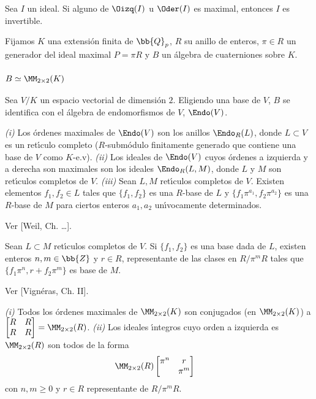 \begin{propoMaxOrdInvertible}
 Sea $I$ un ideal. Si alguno de $\Oizq(I)$ u $\Oder(I)$ es maximal,
 entonces $I$ es invertible.
\end{propoMaxOrdInvertible}

Fijamos $K$ una extensi\'{o}n finita de $\bb{Q}_{p}$, $R$ su anillo de
enteros, $\pi\in R$ un generador del ideal maximal $P=\pi R$ y $B$ un
\'{a}lgebra de cuaterniones sobre $K$.

\subsubsection{$B\simeq\MM_{2\times 2}(K)$}
Sea $V/K$ un espacio vectorial de dimensi\'{o}n $2$. Eligiendo una base
de $V$, $B$ se identifica con el \'{a}lgebra de endomorfismos de $V$,
$\Endo(V)$.

\begin{propoLatticesSplitAlg}
 \textit{(i)} Los \'{o}rdenes maximales de $\Endo(V)$ son los anillos
 $\Endo_{R}(L)$, donde $L\subset V$ es un ret\'{\i}culo completo
 ($R$-subm\'{o}dulo finitamente generado que contiene una base de $V$
 como $K$-e.v).
 \textit{(ii)} Los ideales de $\Endo(V)$ cuyos \'{o}rdenes a izquierda y a
 derecha son maximales son los ideales $\Endo_{R}(L,M)$, donde $L$ y $M$ son
 ret\'{\i}culos completos de $V$.
 \textit{(iii)} Sean $L,M$ ret\'{\i}culos completos de $V$. Existen elementos
 $f_{1},f_{2}\in L$ tales que $\{f_{1},f_{2}\}$ es una $R$-base de $L$ y
 $\{f_{1}\pi^{a_{1}},f_{2}\pi^{a_{2}}\}$ es una $R$-base de $M$ para
 ciertos enteros $a_{1},a_{2}$ un\'{\i}vocamente determinados.
\end{propoLatticesSplitAlg}

Ver [Weil, Ch. \dots].

\begin{propoLatticesSplitAlgCont}
 Sean $L\subset M$ ret\'{\i}culos completos de $V$. Si $\{f_{1},f_{2}\}$ es
 una base dada de $L$, existen enteros $n,m\in\bb{Z}$ y $r\in R$,
 representante de las clases en $R/\pi^{m}R$ tales que
 $\{f_{1}\pi^{n},r+f_{2}\pi^{m}\}$ es base de $M$.
\end{propoLatticesSplitAlgCont}

Ver [Vign\'{e}ras, Ch. II].

\begin{teoMaxOrdsSplitAlg}
 \textit{(i)} Todos los \'{o}rdenes maximales de $\MM_{2\times 2}(K)$ son
 conjugados (en $\MM_{2\times 2}(K)$) a
 $\begin{bmatrix} R & R \\ R & R \end{bmatrix}=\MM_{2\times 2}(R)$.
 \textit{(ii)} Los ideales \'{\i}ntegros cuyo orden a izquierda es
 $\MM_{2\times 2}(R)$ son todos de la forma
 \begin{align*}
	& \MM_{2\times 2}(R)
	\begin{bmatrix} \pi^{n} & r \\ & \pi^{m} \end{bmatrix}
 \end{align*}
 con $n,m\geq 0$ y $r\in R$ representante de $R/\pi^{m}R$.
\end{teoMaxOrdsSplitAlg}

